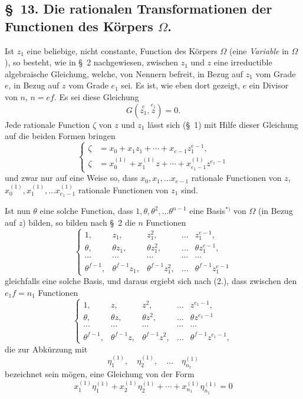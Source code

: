 \documentclass{article}
\begin{document}

\subsection*{§~13. Die rationalen Transformationen der Functionen des Körpers $\Omega$.}

Ist $z_{1}$ eine beliebige, nicht constante, Function des Körpers $\Omega$ (eine \emph{Variable} in $\Omega$), so besteht, wie in §~2 nachgewiesen, zwischen $z_{1}$ und $z$ eine irreductible algebraische Gleichung, welche, von Nennern befreit, in Bezug auf $z_{1}$ vom Grade $e$, in Bezug auf $z$ vom Grade $e_{1}$ sei. Es ist, wie eben dort gezeigt, $e$ ein Divisor von $n$, $n = ef$. Es sei diese Gleichung
\[ G(\overset{e}{z_{1}}, \overset{e_{1}}{z}) = 0. \tag{1.} \]
Jede rationale Function $\zeta$ von $z$ und $z_{1}$ lässt sich (§~1) mit Hilfe dieser Gleichung auf die beiden Formen bringen
\[ \left\{ \begin{aligned} \zeta &= x_{0} + x_{1}z_{1} + \cdots + x_{e-1}z_{1}^{e-1}, \\ \zeta &= x_{0}^{(1)} + x_{1}^{(1)}z + \cdots + x_{e_{1}-1}^{(1)}z^{e_{1}-1} \end{aligned} \right. \tag{2.} \]
und zwar nur auf eine Weise so, dass $x_{0}, x_{1}, \ldots x_{e-1}$ rationale Functionen von $z$, $x_{0}^{(1)}, x_{1}^{(1)}, \ldots x_{e_{1}-1}^{(1)}$ rationale Functionen von $z_{1}$ sind.

Ist nun $\theta$ eine solche Function, dass $1, \theta, \theta^{2}, \ldots \theta^{n-1}$ eine Basis${}^{*)}$ von $\Omega$ (in Bezug auf $z$) bilden, so bilden nach §~2 die $n$ Functionen
\[ \left\{ \begin{matrix} 1, & z_{1}, & z_{1}^{2}, & \ldots & z_{1}^{e-1}, \\ \theta, & \theta z_{1}, & \theta z_{1}^{2}, & \ldots & \theta z_{1}^{e-1}, \\ \cdots & \cdots & \cdots & \cdots & \cdots \\ \theta^{f-1}, & \theta^{f-1}z_{1}, & \theta^{f-1}z_{1}^{2}, & \ldots & \theta^{f-1}z_{1}^{e-1} \end{matrix} \right. \tag{3.} \]
gleichfalls eine solche Basis, und daraus ergiebt sich nach (2.), dass zwischen den $e_{1}f = n_{1}$ Functionen
\[ \left\{ \begin{matrix} 1, & z, & z^{2}, & \ldots & z^{e_{1}-1}, \\ \theta, & \theta z, & \theta z^{2}, & \ldots & \theta z^{e_{1}-1} \\ \cdots & \cdots & \cdots & \cdots & \cdots \\ \theta^{f-1}, & \theta^{f-1}z, & \theta^{f-1}z^{2}, & \ldots & \theta^{f-1}z^{e_{1}-1}, \end{matrix} \right. \tag{4.} \]
die zur Abkürzung mit
\[ \eta_{1}^{(1)}, \quad \eta_{2}^{(1)}, \quad \ldots \quad \eta_{n_{1}}^{(1)} \]
bezeichnet sein mögen, eine Gleichung von der Form
\[ x_{1}^{(1)}\eta_{1}^{(1)} + x_{2}^{(1)}\eta_{2}^{(1)} + \cdots + x_{n_{1}}^{(1)}\eta_{n_{1}}^{(1)} = 0 \]
\end{document}
